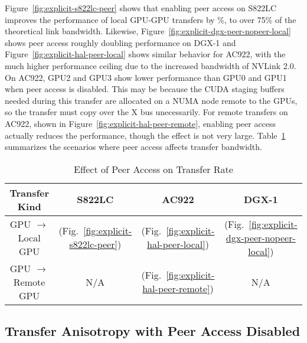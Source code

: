 Figure~\ref{fig:explicit-s822lc-peer} shows that enabling peer access on S822LC improves the performance of local GPU-GPU transfers by \%, to over 75\% of the theoretical link bandwidth.
Likewise, Figure~\ref{fig:explicit-dgx-peer-nopeer-local} shows peer access roughly doubling performance on DGX-1 and Figure~\ref{fig:explicit-hal-peer-local} shows similar behavior for AC922, with the much higher performance ceiling due to the increased bandwidth of NVLink 2.0.
On AC922, GPU2 and GPU3 show lower performance than GPU0 and GPU1 when peer access is disabled.
This may be because the CUDA staging buffers needed during this transfer are allocated on a NUMA node remote to the GPUs, so the transfer must copy over the X bus unecessarily.
For remote transfers on AC922, shown in Figure~\ref{fig:explicit-hal-peer-remote}, enabling peer access actually reduces the performance, though the effect is not very large.
Table~\ref{tab:explicit-peer-rate} summarizes the scenarios where peer access affects transfer bandwidth.

\begin{table}[H]
	\centering
	\caption[Effect of Peer Access on Transfer Rate]{Effect of Peer Access on Transfer Rate}
	\label{tab:explicit-peer-rate}
	\begin{tabular}{cccc}
		\hline
		\textbf{Transfer Kind}       & \textbf{S822LC}                                   & \textbf{AC922}                                       & \textbf{DGX-1}                                             \\ \hline 
		GPU $\rightarrow$ Local GPU  & \checkmark  (Fig.~\ref{fig:explicit-s822lc-peer}) & \checkmark (Fig.~\ref{fig:explicit-hal-peer-local})  & \checkmark (Fig.~\ref{fig:explicit-dgx-peer-nopeer-local}) \\ \hline
		GPU $\rightarrow$ Remote GPU & N/A                                               & \checkmark (Fig.~\ref{fig:explicit-hal-peer-remote}) & N/A                                                        \\ \hline
	\end{tabular}
\end{table}


\subsection{Transfer Anisotropy with Peer Access Disabled}
\label{sec:explicit-peer-direction}

